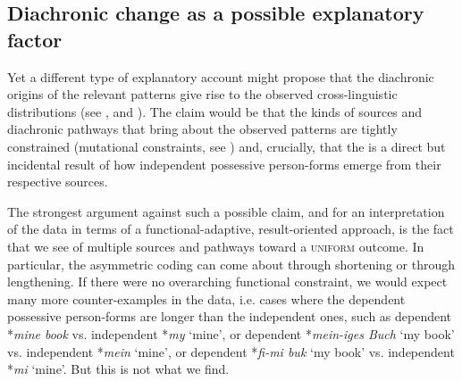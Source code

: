 \documentclass[output=paper]{langsci/langscibook}
\begin{document}
\subsection{ Diachronic change as a possible explanatory factor}

Yet a different type of explanatory account might propose that the diachronic origins of the relevant patterns give rise to the observed cross-linguistic distributions (see \citealt{Cristofaro2017}, and ). The claim would be that the kinds of sources and diachronic pathways that bring about the observed patterns are tightly constrained (mutational constraints, see ) and, crucially, that the  is a direct but incidental result of how independent possessive person-forms emerge from their respective sources. 

The strongest argument against such a possible claim, and for an interpretation of the data in terms of a functional-adaptive, result-oriented approach, is the fact that we see  of multiple sources and pathways toward a \textsc{uniform} outcome. In particular, the asymmetric coding can come about through shortening or through lengthening. If there were no overarching functional constraint, we would expect many more counter-examples in the data, i.e. cases where the dependent possessive person-forms are longer than the independent ones, such as dependent *\textit{mine book} vs. independent *\textit{my} ‘mine’, or  dependent *\textit{mein-iges Buch} ‘my book’ vs. independent *\textit{mein} ‘mine’, or  dependent *\textit{fi-mi buk} ‘my book’ vs. independent *\textit{mi} ‘mine’. But this is not what we find.
\end{document}
